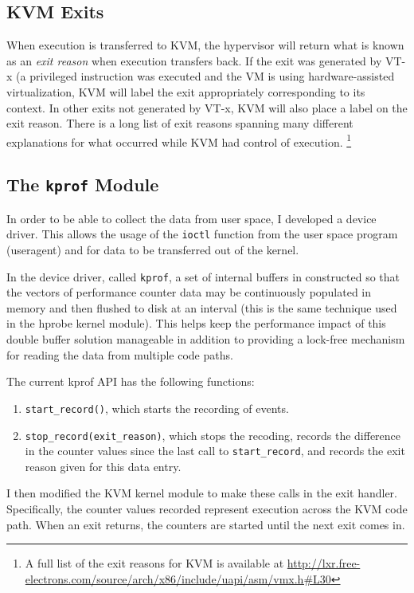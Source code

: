 \documentclass[notitlepage]{article}
\begin{document}
\subsection{KVM Exits}
When execution is transferred to KVM, the hypervisor will return what is known
as an \textit{exit reason} when execution transfers back. If the exit was
generated by VT-x (a privileged instruction was executed and the VM is using
hardware-assisted virtualization, KVM will label the exit appropriately
corresponding to its context. In other exits not generated by VT-x, KVM will
also place a label on the exit reason. There is a long list of exit reasons
spanning many different explanations for what occurred while KVM had control of
execution. \footnote{A full list of the exit reasons for KVM is available at
\url{http://lxr.free-electrons.com/source/arch/x86/include/uapi/asm/vmx.h\#L30}}

\subsection{The \texttt{kprof} Module}
In order to be able to collect the data from user space, I developed a device
driver. This allows the usage of the \texttt{ioctl} function from the user space
program (useragent) and for data to be transferred out of the kernel.

In the device driver, called \texttt{kprof}, a set of internal buffers in
constructed so that the vectors of performance counter data may be continuously
populated in memory and then flushed to disk at an interval (this is the same
technique used in the hprobe kernel module).  This helps keep the performance
impact of this double buffer solution manageable in addition to providing a
lock-free mechanism for reading the data from multiple code paths.

The current kprof API has the following functions:
\begin{enumerate}
    \item{\texttt{start\_record()}, which starts the recording of events.}
    \item{\texttt{stop\_record(exit\_reason)}, which stops the recoding, records
        the difference in the counter values since the last call to
    \texttt{start\_record}, and records the exit reason given for this data
entry.}
\end{enumerate}

I then modified the KVM kernel module to make these calls in the exit handler.
Specifically, the counter values recorded represent execution across the KVM
code path. When an exit returns, the counters are started until the next exit
comes in.
\end{document}
